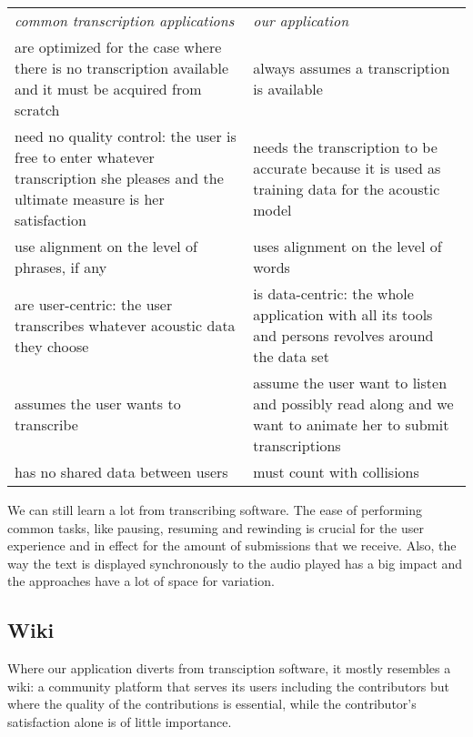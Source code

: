 \documentclass{llncs}
\begin{document}
\noindent
\begin{tabularx}{\textwidth}{
    @{\hspace{1.5em}}%
    >{\leavevmode\llap{\textbullet~}\raggedright}%
    X%
    @{\quad\hspace{1.5em}}%
    >{\leavevmode\llap{\textbullet~}\raggedright\arraybackslash}%
    X%
    @{}%
  }
  \em{common transcription applications} & \em{our application} \\
  are optimized for the case where there is no transcription available and it
  must be acquired from scratch &
    always assumes a transcription is available \\
  need no quality control: the user is free to enter whatever transcription she
  pleases and the ultimate measure is her satisfaction &
    needs the transcription to be accurate because it is used as training data
    for the acoustic model \\
  use alignment on the level of phrases, if any &
    uses alignment on the level of words \\
  are user-centric: the user transcribes whatever acoustic data they choose &
    is data-centric: the whole application with all its tools and persons
    revolves around the data set \\
  assumes the user wants to transcribe &
    assume the user want to listen and possibly read along and we want to
    animate her to submit transcriptions \\
  has no shared data between users &
    must count with collisions
\end{tabularx}

We can still learn a lot from transcribing software. The ease of performing
common tasks, like pausing, resuming and rewinding is crucial for the user
experience and in effect for the amount of submissions that we receive. Also,
the way the text is displayed synchronously to the audio played has a big impact
and the approaches have a lot of space for variation.

\subsection{Wiki}

Where our application diverts from transciption software, it mostly resembles a
wiki: a community platform that serves its users including the contributors but
where the quality of the contributions is essential, while the contributor's
satisfaction alone is of little importance.
\end{document}
